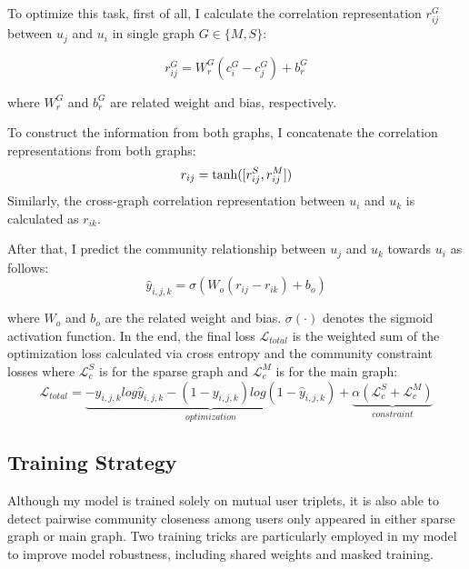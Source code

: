 To optimize this task, first of all, I calculate the correlation representation $r^{G}_{ij}$ between $u_j$ and $u_i$ in single graph $G \in \{M,S\}$:

\begin{equation}\label{eq:gr}
r^{G}_{ij} = W^{G}_{r}(c_{i}^{G} - c_{j}^{G}) +  b^{G}_{r} 
\end{equation}

where $ W^{G}_{r}$ and $ b^{G}_{r}$ are related weight and bias, respectively. 

To construct the information from both graphs, I concatenate the correlation representations from both graphs:
\begin{equation} \label{eq:cr}
r_{ij} = {\rm tanh}([r^{S}_{ij},r^{M}_{ij}])
\end{equation}
Similarly, the cross-graph correlation representation  between $u_i$ and $u_k$ is calculated as $r_{ik}$. 

After that, I predict the community relationship between $u_j$ and $u_k$ towards $u_i$ as follows:
\begin{equation} \label{eq:yp}
\hat{y}_{i,j,k} = \sigma(W_{o}(r_{ij} - r_{ik}) +  b_{o})
\end{equation}

where $W_{o}$ and $b_{o}$ are the related weight and bias. $\sigma(\cdot)$ denotes the sigmoid activation function. In the end, the final loss $\mathcal{L}_{total}$ is the weighted sum of the optimization loss calculated via cross entropy and the community constraint losses where  $\mathcal{L}_{c}^S$ is for the sparse graph and $\mathcal{L}_{c}^M$ is for the main graph:
\begin{equation}\label{eq:loss}
\mathcal{L}_{total} = \underbrace{-y_{i,j,k}log\hat{y}_{i,j,k}-(1-y_{i,j,k})log(1-\hat{y}_{i,j,k})}_{optimization} + \underbrace{\alpha(\mathcal{L}_{c}^S + \mathcal{L}_{c}^M)}_{constraint}
\end{equation}

\subsection{Training Strategy}\label{sc:mt}

Although my model is trained solely on mutual user triplets, it is also able to detect pairwise community closeness among users only appeared in either sparse graph or main graph. Two training tricks are particularly employed in my model to improve model robustness, including shared weights and masked training. 

